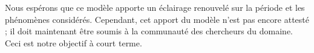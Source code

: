 Nous espérons que ce modèle apporte un éclairage renouvelé sur la période et les phénomènes considérés.
Cependant, cet apport du modèle n'est pas encore attesté ; il doit maintenant être soumis à la communauté des chercheurs du domaine.
Ceci est notre objectif à court terme.


\printbibliography[title={Références}]
